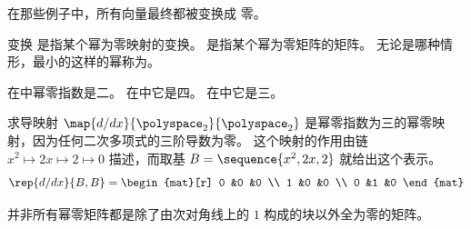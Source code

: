 在那些例子中，所有向量最终都被变换成
零。

\begin{definition} \label{def:nilpotent} 
变换%
是指某个幂为零映射的变换。
%
是指某个幂为零矩阵的矩阵。
无论是哪种情形，最小的这样的幂称为。%
\end{definition}

\begin{example}
在中幂零指数是二。
在中它是四。
在中它是三。
\end{example}

\begin{example}
求导映射 \( \map{d/dx}{\polyspace_2}{\polyspace_2} \)
是幂零指数为三的幂零映射，因为任何二次多项式的三阶导数为零。
这个映射的作用由链
$x^2\mapsto 2x\mapsto 2\mapsto 0$
描述，而取基 \( B=\sequence{x^2,2x,2} \)
就给出这个表示。
\begin{equation*}
  \rep{d/dx}{B,B}=
  \begin{mat}[r]
     0  &0  &0  \\
     1  &0  &0  \\
     0  &1  &0
  \end{mat}
\end{equation*}
\end{example}

并非所有幂零矩阵都是除了由次对角线上的
$1$ 构成的块以外全为零的矩阵。

